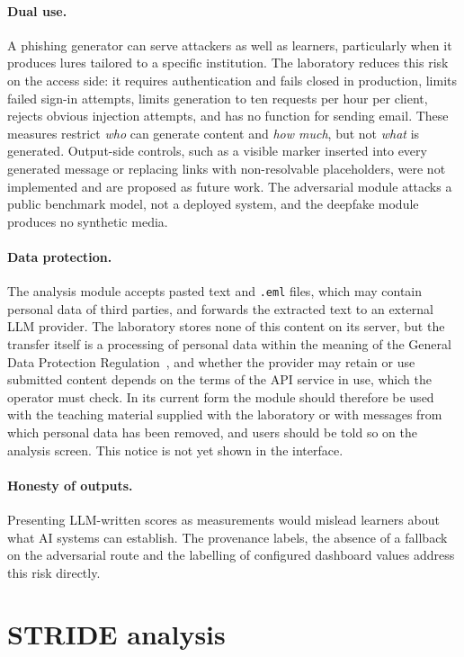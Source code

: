 \paragraph{Dual use.} A phishing generator can serve attackers as well as learners, particularly when it produces lures tailored to a specific institution. The laboratory reduces this risk on the access side: it requires authentication and fails closed in production, limits failed sign-in attempts, limits generation to ten requests per hour per client, rejects obvious injection attempts, and has no function for sending email. These measures restrict \emph{who} can generate content and \emph{how much}, but not \emph{what} is generated. Output-side controls, such as a visible marker inserted into every generated message or replacing links with non-resolvable placeholders, were not implemented and are proposed as future work. The adversarial module attacks a public benchmark model, not a deployed system, and the deepfake module produces no synthetic media.

\paragraph{Data protection.} The analysis module accepts pasted text and \texttt{.eml} files, which may contain personal data of third parties, and forwards the extracted text to an external LLM provider. The laboratory stores none of this content on its server, but the transfer itself is a processing of personal data within the meaning of the General Data Protection Regulation~\cite{gdpr2016}, and whether the provider may retain or use submitted content depends on the terms of the API service in use, which the operator must check. In its current form the module should therefore be used with the teaching material supplied with the laboratory or with messages from which personal data has been removed, and users should be told so on the analysis screen. This notice is not yet shown in the interface.

\paragraph{Honesty of outputs.} Presenting LLM-written scores as measurements would mislead learners about what AI systems can establish. The provenance labels, the absence of a fallback on the adversarial route and the labelling of configured dashboard values address this risk directly.

\section{STRIDE analysis}
\label{sec:stride}

